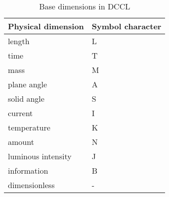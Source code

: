 \documentclass{article}
\begin{document}
\begin{table}
\centering
\caption{Base dimensions in DCCL}
\label{tab:basedims}
\begin{tabular}{l|l}
\hline Physical dimension & Symbol character \\ \hline
\hline length & L \\ 
\hline time & T \\ 
\hline mass & M \\ 
\hline plane angle & A \\ 
\hline solid angle & S \\ 
\hline current & I \\ 
\hline temperature & K \\ 
\hline amount & N \\ 
\hline luminous intensity & J \\ 
\hline information & B \\ 
\hline dimensionless & - \\ 
\end{tabular}
\end{table}
\end{document}
